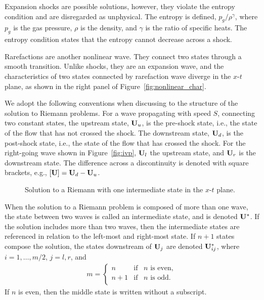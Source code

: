 Expansion shocks are possible solutions, however, they violate the entropy condition and are disregarded as unphysical.  The entropy is defined, $p_g/\rho^{\gamma}$, where $p_g$ is the gas pressure, $\rho$ is the density, and $\gamma$ is the ratio of specific heats.  The entropy condition states that the entropy cannot decrease across a shock.    

Rarefactions are another nonlinear wave.  They connect two states through a smooth transition.  Unlike shocks, they are an expansion wave, and the characteristics of two states connected by rarefaction wave diverge in the $x$-$t$ plane, as shown in the right panel of Figure~\ref{fig:nonlinear_char}.

We adopt the following conventions when discussing to the structure of the solution to Riemann problems.  For a wave propagating with speed $S$, connecting two constant states, the upstream state, $\mathbf{U}_u$, is the pre-shock state, i.e., the state of the flow that has not crossed the shock.  The downstream state, $\mathbf{U}_d$, is the post-shock state, i.e., the state of the flow that has crossed the shock.  For the right-going wave shown in Figure~\ref{fig:ivp}, $\mathbf{U}_l$ the upstream state, and $\mathbf{U}_r$ is the downstream state.  The difference across a discontinuity is denoted with square brackets, e.g., $[ \mathbf{U} ] = \mathbf{U}_d - \mathbf{U}_u$.

\begin{figure}[htbp]
\begin{center}

\end{center}
\caption{Solution to a Riemann with one intermediate state in the $x$-$t$ plane.}
\label{fig:inter_rstates}
\end{figure}

When the solution to a Riemann problem is composed of more than one wave, the state between two waves is called an intermediate state, and is denoted $\mathbf{U}^*$.  If the solution includes more than two waves, then the intermediate states are referenced in relation to the left-most and right-most state.  If $n+1$ states compose the solution, the states downstream of $\mathbf{U}_{j}$ are denoted $\mathbf{U}_{ij}^*$, where $i=1,\hdots,m/2$, $j = l,r$, and
\begin{gather*}
m = 
\begin{cases}
n & \text{if}\;\;\; n \text{ is even}, \\
n+1 & \text{if}\;\;\; n \text{ is odd}. \\
\end{cases}
\end{gather*} 
If $n$ is even, then the middle state is written without a subscript.

